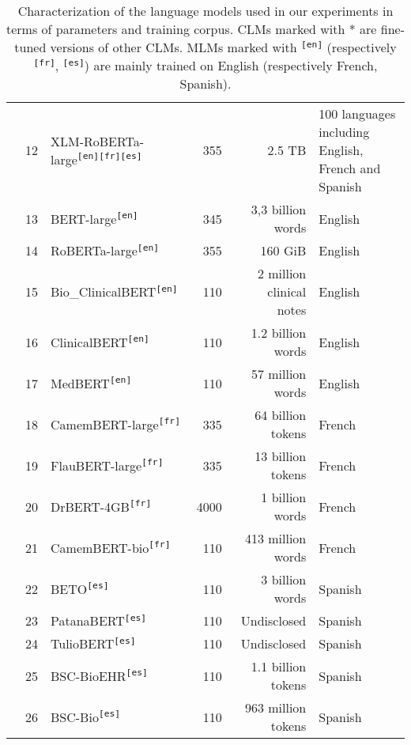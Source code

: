 \begin{table}[ht]
{\begin{tabular}{cllrrl}
 & 12 & XLM-RoBERTa-large\textsuperscript{\texttt{[en]}}\textsuperscript{\texttt{[fr]}}\textsuperscript{\texttt{[es]}} \cite{conneau2020unsupervised} & 355 & 2.5 TB & 100 languages including English, French and Spanish \\
 & 13 & BERT-large\textsuperscript{\texttt{[en]}} \cite{devlin2019bert} & 345 & 3,3 billion words & English \\
 & 14 & RoBERTa-large\textsuperscript{\texttt{[en]}} \cite{liu2019roberta} & 355 & 160 GiB & English \\
 & 15 & Bio\_ClinicalBERT\textsuperscript{\texttt{[en]}} \cite{alsentzer2019publicly} & 110 & 2 million clinical notes & English \\
 & 16 & ClinicalBERT\textsuperscript{\texttt{[en]}} \cite{wang2023optimized} & 110 & 1.2 billion words & English \\
 & 17 & MedBERT\textsuperscript{\texttt{[en]}} \cite{charangan2022medbert} & 110 & 57 million words & English \\
 & 18 & CamemBERT-large\textsuperscript{\texttt{[fr]}} \cite{martin2019camembert} & 335 & 64 billion tokens & French \\
 & 19 & FlauBERT-large\textsuperscript{\texttt{[fr]}} \cite{le2019flaubert} & 335 & 13 billion tokens & French \\
 & 20 & DrBERT-4GB\textsuperscript{\texttt{[fr]}} \cite{labrak2023drbert} & 4000 & 1 billion words & French \\
 & 21 & CamemBERT-bio\textsuperscript{\texttt{[fr]}} \cite{touchent2023camembertbio} & 110 & 413 million words & French \\
 & 22 & BETO\textsuperscript{\texttt{[es]}} \cite{canete2020beto} & 110 & 3 billion words & Spanish \\
 & 23 & PatanaBERT\textsuperscript{\texttt{[es]}} & 110 & Undisclosed & Spanish \\
 & 24 & TulioBERT\textsuperscript{\texttt{[es]}} & 110 & Undisclosed & Spanish \\
 & 25 & BSC-BioEHR\textsuperscript{\texttt{[es]}} \cite{carrino2022pretrained} & 110 & 1.1 billion tokens & Spanish \\
 & 26 & BSC-Bio\textsuperscript{\texttt{[es]}} \cite{carrino2022pretrained} & 110 & 963 million tokens & Spanish \\
\bottomrule
\end{tabular}}
\caption{Characterization of the language models used in our experiments in terms of parameters and training corpus. CLMs marked with * are fine-tuned versions of other CLMs. MLMs marked with \textsuperscript{\texttt{[en]}} (respectively \textsuperscript{\texttt{[fr]}}, \textsuperscript{\texttt{[es]}}) are mainly trained on English (respectively French, Spanish).}
\label{tab:LM_features}
\end{table}
